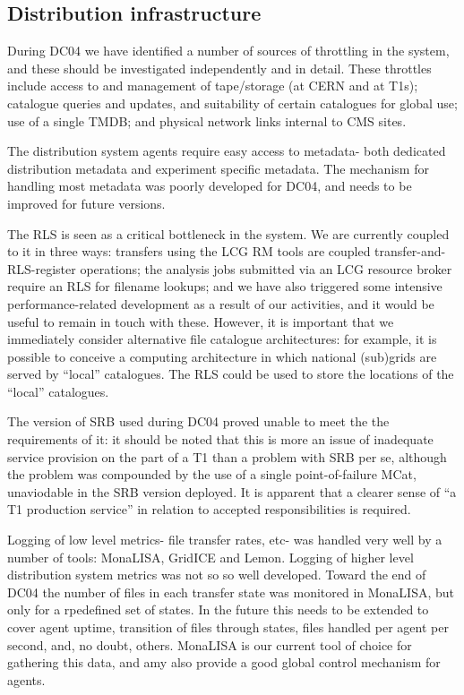 \documentclass{cmspaper}
\begin{document}
\subsection{Distribution infrastructure}
During DC04 we have identified a number of sources of throttling in
the system, and these should be investigated independently and in
detail. These throttles include access to and management of
tape/storage (at CERN and at T1s); catalogue queries and updates, and
suitability of certain catalogues for global use; use of a single
TMDB; and physical network links internal to CMS sites.

The distribution system agents require easy access to metadata- both
dedicated distribution metadata and experiment specific metadata. The
mechanism for handling most metadata was poorly developed for DC04,
and needs to be improved for future versions.

The RLS is seen as a critical bottleneck in the system. We are
currently coupled to it in three ways: transfers using the LCG RM
tools are coupled transfer-and-RLS-register operations; the analysis
jobs submitted via an LCG resource broker require an RLS for filename
lookups; and we have also triggered some intensive performance-related
development as a result of our activities, and it would be useful to
remain in touch with these. However, it is important that we
immediately consider alternative file catalogue architectures: for
example, it is possible to conceive a computing architecture in which
national (sub)grids are served by ``local'' catalogues. The RLS could
be used to store the locations of the ``local'' catalogues.

The version of SRB used during DC04 proved unable to meet the the
requirements of it: it should be noted that this is more an issue of
inadequate service provision on the part of a T1 than a problem with
SRB per se, although the problem was compounded by the use of a single
point-of-failure MCat, unaviodable in the SRB version deployed. It is
apparent that a clearer sense of ``a T1 production service'' in
relation to accepted responsibilities is required.

Logging of low level metrics- file transfer rates, etc- was handled
very well by a number of tools: MonaLISA, GridICE and Lemon. Logging
of higher level distribution system metrics was not so so well
developed. Toward the end of DC04 the number of files in each transfer
state was monitored in MonaLISA, but only for a rpedefined set of
states. In the future this needs to be extended to cover agent uptime,
transition of files through states, files handled per agent per
second, and, no doubt, others. MonaLISA is our current tool of choice
for gathering this data, and amy also provide a good global control
mechanism for agents.
\end{document}
